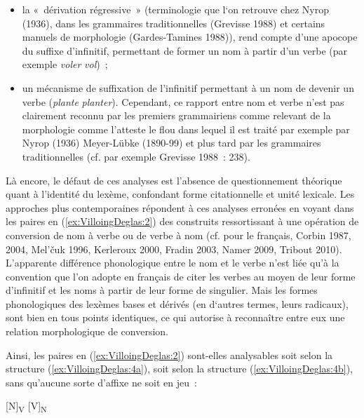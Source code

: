 \documentclass[output=paper]{langsci/langscibook}
\begin{document}
\begin{itemize}

\item
  la «~dérivation régressive~» (terminologie que l`on retrouve chez
  Nyrop (1936), dans les grammaires traditionnelles (Grevisse 1988) et
  certains manuels de morphologie (Gardes-Tamines 1988)), rend compte
  d'une apocope du suffixe d'infinitif, permettant de former un nom à
  partir d'un verbe (par exemple \emph{voler} \textrightarrow{} \emph{vol})~;
\item
  un mécanisme de suffixation de l'infinitif permettant à un nom de
  devenir un verbe (\emph{plante} \textrightarrow{} \emph{planter}). Cependant, ce
  rapport entre nom et verbe n'est pas clairement reconnu par les
  premiers grammairiens comme relevant de la morphologie comme l'atteste
  le flou dans lequel il est traité par exemple par Nyrop (1936)
  Meyer-Lübke (1890-99) et plus tard par les grammaires traditionnelles
  (cf. par exemple Grevisse 1988~: 238).
\end{itemize}

Là encore, le défaut de ces analyses est l'absence de questionnement
théorique quant à l'identité du lexème, confondant forme citationnelle
et unité lexicale. Les approches plus contemporaines répondent à ces
analyses erronées en voyant dans les paires en (\ref{ex:VilloingDeglas:2}) des construits
ressortissant à une opération de conversion de nom à verbe ou de verbe à
nom (cf. pour le français, Corbin 1987, 2004, Mel'čuk 1996, Kerleroux
2000, Fradin 2003, Namer 2009, Tribout 2010). L'apparente différence
phonologique entre le nom et le verbe n'est liée qu'à la convention que
l'on adopte en français de citer les verbes au moyen de leur forme
d'infinitif et les noms à partir de leur forme de singulier. Mais les
formes phonologiques des lexèmes bases et dérivés (en d`autres termes,
leurs radicaux), sont bien en tous points identiques, ce qui autorise à
reconnaître entre eux une relation morphologique de conversion.

Ainsi, les paires en (\ref{ex:VilloingDeglas:2}) sont-elles analysables soit selon la structure
(\ref{ex:VilloingDeglas:4a}), soit selon la structure (\ref{ex:VilloingDeglas:4b}), sans qu'aucune sorte d'affixe ne
soit en jeu~:


\ea\label{ex:VilloingDeglas:4}

  \ea\label{ex:VilloingDeglas:4a} {[}N{]}\textsubscript{V}
  \ex\label{ex:VilloingDeglas:4b} {[}V{]}\textsubscript{N}
  \z

\z
\end{document}
